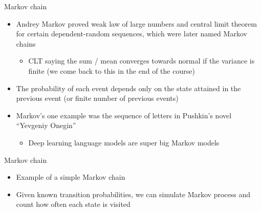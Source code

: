 \documentclass[finnish,english,t]{beamer}
\renewcommand{\emph}[1]{\textcolor{navyblue}{#1}}
\begin{document}
\begin{frame}{Markov chain}

  \begin{itemize}
  \item<1-> \emph{Andrey Markov} proved weak law of large numbers and central
    limit theorem for certain dependent-random sequences, which were
    later named Markov chains
    \begin{itemize}
    \item {\color{gray} CLT saying the sum / mean converges towards normal if the variance is finite (we come back to this in the end of the course)}
    \end{itemize}
  \item<2-> The probability of each event depends only on the state
    attained in the previous event (or finite number of previous events)
  \item<3-> Markov's one example was the sequence of letters in
    Pushkin's novel ``Yevgeniy Onegin''
    \begin{itemize}
    \item<4-> {\color{gray} Deep learning language models are super
        big Markov models}
    \end{itemize}
  \end{itemize}

\end{frame}  

\begin{frame}{Markov chain}

  \begin{itemize}
  \item<+-> Example of a simple Markov chain
  \item<+-> Given known transition probabilities, we can simulate
    Markov process and count how often each state is visited
  \end{itemize}

\end{frame}  
\end{document}
